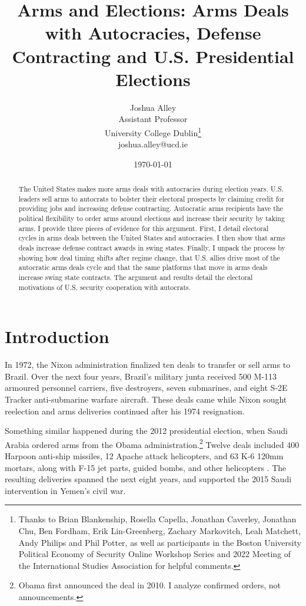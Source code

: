\documentclass[12pt]{article}
\title{\textbf{Arms and Elections: Arms Deals with Autocracies, Defense Contracting and U.S. Presidential Elections}}
\author{Joshua Alley \\
Assistant Professor \\
University College Dublin\thanks{Thanks to Brian Blankenship, Rosella Capella, Jonathan Caverley, Jonathan Chu, Ben Fordham, Erik Lin-Greenberg, Zachary Markovitch, Leah Matchett, Andy Philips and Phil Potter, as well as participants in the Boston University Political Economy of Security Online Workshop Series and 2022 Meeting of the International Studies Association for helpful comments.} \\
joshua.alley@ucd.ie 
}
\date{\today}
\begin{document}
\maketitle 

\begin{abstract} 
The United States makes more arms deals with autocracies during election years. 
U.S. leaders sell arms to autocrats to bolster their electoral prospects by claiming credit for providing jobs and increasing defense contracting.
Autocratic arms recipients have the political flexibility to order arms around elections and increase their security by taking arms. 
I provide three pieces of evidence for this argument.  
First, I detail electoral cycles in arms deals between the United States and autocracies. 
I then show that arms deals increase defense contract awards in swing states.
Finally, I unpack the process by showing how deal timing shifts after regime change, that U.S. allies drive most of the autocratic arms deals cycle and that the same platforms that move in arms deals increase swing state contracts.  
The argument and results detail the electoral motivations of U.S. security cooperation with autocrats. 
\end{abstract} 

\thispagestyle{empty}
\setcounter{page}{0} 

\newpage 
\doublespace 


\section{Introduction}



In 1972, the Nixon administration finalized ten deals to transfer or sell arms to Brazil.
Over the next four years, Brazil's military junta received 500 M-113 armoured personnel carriers, five destroyers, seven submarines, and eight S-2E Tracker anti-submarine warfare aircraft.
These deals came while Nixon sought reelection and arms deliveries continued after his 1974 resignation. 


Something similar happened during the 2012 presidential election, when Saudi Arabia ordered arms from the Obama administration.\footnote{Obama first announced the deal in 2010. I analyze confirmed orders, not announcements.} 
Twelve deals included 400 Harpoon anti-ship missiles, 12 Apache attack helicopters, and 63 K-6 120mm mortars, along with F-15 jet parts, guided bombs, and other helicopters \citep{SIPRI2021}. 
The resulting deliveries spanned the next eight years, and supported the 2015 Saudi intervention in Yemen's civil war.
\end{document}
